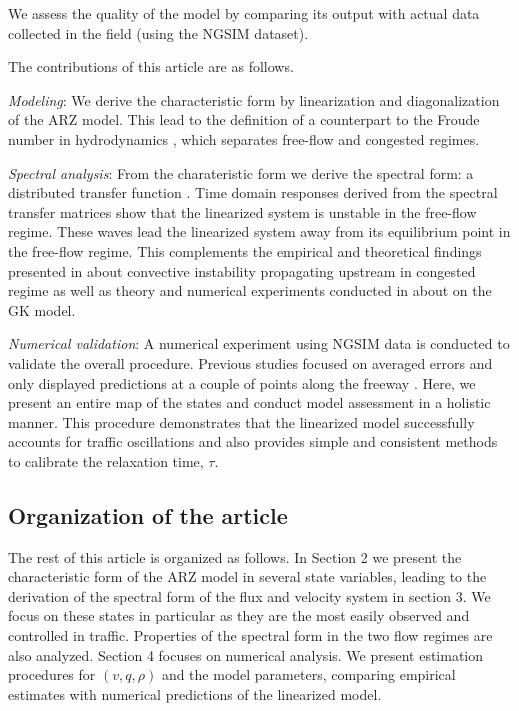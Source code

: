 \documentclass[5p,twocolumn]{elsarticle}
\begin{document}
We assess the quality of the model by comparing its output with actual data collected in the field (using the NGSIM dataset).

The contributions of this article are as follows.

\textit{Modeling}: We derive the characteristic form by linearization and diagonalization of the ARZ model. This lead to the definition of a counterpart to the Froude number in hydrodynamics \cite{litrico2009modeling}, which separates free-flow and congested regimes.

\textit{Spectral analysis}: From the charateristic form we derive the spectral form: a distributed transfer function \cite{litrico2009modeling}. Time domain responses derived from the spectral transfer matrices show that the linearized system is unstable in the free-flow regime. These waves lead the linearized system away from its equilibrium point in the free-flow regime. This complements the empirical and theoretical findings presented in \cite{treiber2011evidence,wardWilson2011} about convective instability propagating upstream in congested regime as well as theory and numerical experiments conducted in \cite{GuptaStab1, GuptaStab2} about on the GK model.

\textit{Numerical validation}: A numerical experiment using NGSIM data is conducted to validate the overall procedure. Previous studies focused on averaged errors and only displayed predictions at a couple of points along the freeway \cite{GodunovARZ,Fan}. Here, we present an entire map of the states and conduct model assessment in a holistic manner. This procedure demonstrates that the linearized model successfully accounts for traffic oscillations and also provides simple and consistent methods to calibrate the relaxation time, $\tau$.

\subsection{Organization of the article}
The rest of this article is organized as follows. In Section 2 we present the characteristic form of the ARZ model in several state variables, leading to the derivation of the spectral form of the flux and velocity system in section 3. We focus on these states in particular as they are the most easily observed and controlled in traffic. Properties of the spectral form in the two flow regimes are also analyzed. Section 4 focuses on numerical analysis. We present estimation procedures for $(v,q,\rho)$ and the model parameters, comparing empirical estimates with numerical predictions of the linearized model.
\end{document}
